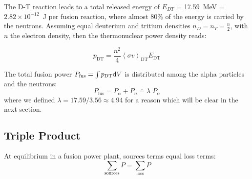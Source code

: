 The D-T reaction leads to a total released energy of $E_{DT}$ = 17.59~\si{MeV} = $2.82\times 10^{-12}$~\si{J} per fusion reaction, where almost 80\% of the energy is carried by the neutrons. Assuming equal deuterium and tritium densities $n_D = n_T = \frac{n}{2}$, with $n$ the electron density, then the thermonuclear power density reads:

\begin{equation}
p_{\mathrm{DT}} = 
	\frac{n^2}{4}  \left< \sigma v \right>_{\mathrm{DT}} E_{\mathrm{DT}}
	\label{eq:fusion_power}
\end{equation}

The total fusion power $P_{\mathrm{fus}}=\int p_{\mathrm{DT}} {\mathrm{d}} V$ is distributed among the alpha particles and the neutrons: 
\begin{equation}
P_{\mathrm{fus}}
= 
P_\alpha + P_n 
\doteq
\lambda \; P_\alpha
\label{eq:P_fus_Palpha}
\end{equation}
where we defined $\lambda = 17.59/3.56 \approx 4.94$ for a reason which will be clear in the next section.


%

\subsection{Triple Product}
At equilibrium in a fusion power plant, sources terms equal loss terms:
\begin{equation}
	\sum_{\mathrm{sources}} P = \sum_{\mathrm{loss}} P
	\label{eq:power_balance_general}
\end{equation}

